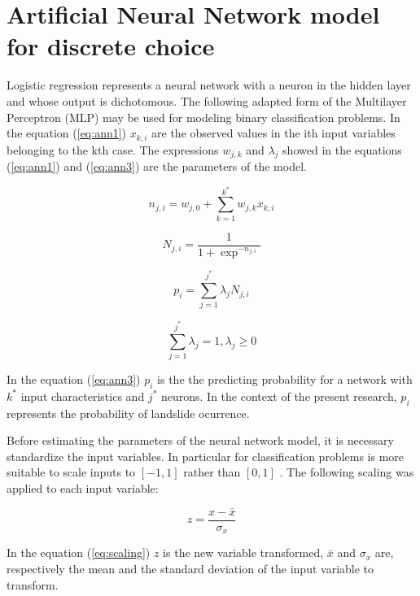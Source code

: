 \documentclass[11pt,twoside]{rmta2010esp}%
\begin{document}
\section{Artificial Neural Network model for discrete choice}
Logistic regression represents a neural network with 
a neuron in the hidden layer and whose output is dichotomous. The following adapted form of the Multilayer Perceptron (MLP) may be used for modeling binary classification problems. In the equation (\ref{eq:ann1}) $x_{k,i}$ are the observed values in the ith input variables belonging to the kth case. The expressions $w_{j,k}$ and $\lambda_{j}$ showed in the equations (\ref{eq:ann1}) and (\ref{eq:ann3}) are the parameters of the model. 


\begin{equation}
n_{j,i} = w_{j,0} + \sum_{k=1}^{k^{*}} w_{j,k}x_{k,i}
\label{eq:ann1}
\end{equation}

\begin{equation}
N_{j,i} = \frac{1}{1+\exp^{-n_{j,i}}}
\label{eq:ann2}
\end{equation}



\begin{equation}
p_{i} = \sum_{j=1}^{j^{*}} \lambda_{j} N_{j,i}
\label{eq:ann3}
\end{equation}

\begin{equation}
\sum_{j=1}^{j^{*}} \lambda_{j} = 1 , \lambda_{j} \ge 0
\label{eq:ann4}
\end{equation}


In the equation (\ref{eq:ann3}) $p_{i}$ is the the predicting probability for a network with $ k^{*} $ input characteristics and $ j^{*} $ neurons. In the context of the present research, $p_{i} $ represents the probability of landslide ocurrence.

Before estimating the parameters of the neural network model, it is necessary standardize the input variables. In particular for classification problems is more suitable to scale inputs to $[-1,1]$ rather than $[0,1]$ \cite{FAQANN}. The following scaling was applied to each input variable: 

\begin{equation}
z = \frac{x - \bar{x} }{\sigma_{x}}
\label{eq:scaling}
\end{equation}

In the equation (\ref{eq:scaling}) $z$ is the new variable transformed, $ \bar{x} $ and $\sigma_{x}$ are, respectively the mean and the standard deviation of the input variable to transform.  
\end{document}
